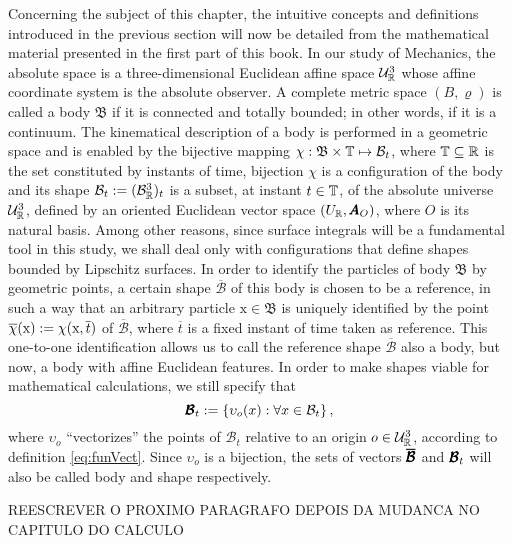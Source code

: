 Concerning the subject of this chapter, the intuitive concepts and definitions introduced in the previous section will now be detailed from the mathematical material presented in the first part of this book. In our study of Mechanics, the absolute space is a three-dimensional Euclidean affine space $\eamd{U}{R}{3}$ whose affine coordinate system is the absolute observer. A complete metric space $(B,\varrho)$ is called a body $\mathfrak{B}$ if it is connected and totally bounded; in other words, if it is a continuum. The kinematical description of a body is performed in a geometric space and is enabled by the bijective mapping $\map{\chi}{\mathfrak{B}\times\tempo}{\mathcal{B}_t}$, where $\tempo\subseteq\real$ is the set constituted by instants of time, bijection $\chi$ is a configuration of the body and its shape $\mathcal{B}_t:=(\eamd{B}{R}{3})_t$ is a subset, at instant $t\in\tempo$, of the absolute universe $\eamd{U}{R}{3}$, defined by an oriented Euclidean vector space $(U_\real,\tnr{A}_O)$, where $O$ is its natural basis. Among other reasons, since surface integrals will be a fundamental tool in this study, we shall deal only with configurations that define shapes bounded by Lipschitz surfaces. In order to identify the particles of body $\mathfrak{B}$ by geometric points, a certain shape $\overline{\mathcal{B}}$ of this body is chosen to be a reference, in such a way that an arbitrary particle $\text{x}\in\mathfrak{B}$ is uniquely identified by the point $\fua{\overline{\chi}}{\text{x}}:=\fua{\chi}{\text{x},\overline{t}}$ of $\overline{\mathcal{B}}$, where $\overline{t}$ is a fixed instant of time taken as reference. This one-to-one identification allows us to call the reference shape $\overline{\mathcal{B}}$ also a body, but now, a body with affine Euclidean features. In order to make shapes viable for mathematical calculations, we still specify that
\begin{equation}
\tnr{\mathcal{B}}_t:=\{\fua{\upsilon_o}{x}:\forall x\in\mathcal{B}_t\}\,,
\end{equation}
where $\upsilon_o$ ``vectorizes'' the points of $\mathcal{B}_t$ relative to an origin $o\in\eamd{U}{R}{3}$, according to definition \eqref{eq:funVect}. Since $\upsilon_o$ is a bijection, the sets of vectors $\tnr{\overline{\mathcal{B}}}$ and $\tnr{\mathcal{B}}_t$ will also be called body and shape respectively.

REESCREVER O PROXIMO PARAGRAFO DEPOIS DA MUDANCA NO CAPITULO DO CALCULO 

